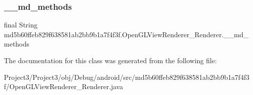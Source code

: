 \subsubsection{\texorpdfstring{\+\_\+\+\_\+md\+\_\+methods}{\_\_md\_methods}}
{\footnotesize\ttfamily final String md5b60ffeb829f638581ab2bb9b1a7f4f3f.\+Open\+G\+L\+View\+Renderer\+\_\+\+Renderer.\+\_\+\+\_\+md\+\_\+methods\hspace{0.3cm}{\ttfamily [static]}}



The documentation for this class was generated from the following file\+:\begin{DoxyCompactItemize}
\item 
Project3/\+Project3/obj/\+Debug/android/src/md5b60ffeb829f638581ab2bb9b1a7f4f3f/Open\+G\+L\+View\+Renderer\+\_\+\+Renderer.\+java\end{DoxyCompactItemize}
